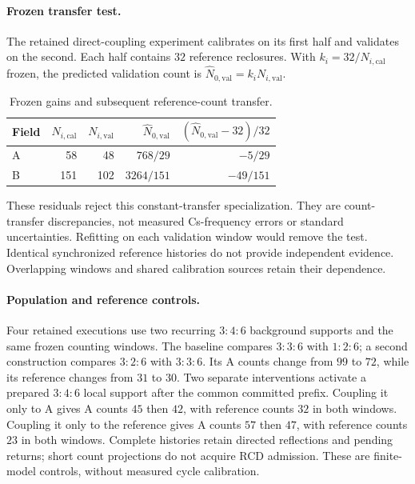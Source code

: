 \paragraph{Frozen transfer test.}
The retained direct-coupling experiment calibrates on its first half and
validates on the second. Each half contains \(32\) reference reclosures.
With \(k_i=32/N_{i,\mathrm{cal}}\) frozen, the predicted validation count is
\(\widehat N_{0,\mathrm{val}}=k_iN_{i,\mathrm{val}}\).
\begin{table}[H]
\centering
\caption{Frozen gains and subsequent reference-count transfer.}
\label{tab:manual-m3-anchor-transfer}
\begin{tabular}{lrrrr}
\toprule
Field & \(N_{i,\mathrm{cal}}\) & \(N_{i,\mathrm{val}}\) &
 \(\widehat N_{0,\mathrm{val}}\) & \((\widehat N_{0,\mathrm{val}}-32)/32\)\\
\midrule
A & 58 & 48 & \(768/29\) & \(-5/29\)\\
B & 151 & 102 & \(3264/151\) & \(-49/151\)\\
\bottomrule
\end{tabular}
\end{table}
These residuals reject this constant-transfer specialization. They are
count-transfer discrepancies, not measured Cs-frequency errors or standard
uncertainties. Refitting on each validation window would remove the test.
Identical synchronized reference histories do not provide independent
evidence. Overlapping windows and shared calibration sources retain their
dependence.

\paragraph{Population and reference controls.}
Four retained executions use two recurring \(3{:}4{:}6\) background supports
and the same frozen counting windows.
The baseline compares \(3{:}3{:}6\) with \(1{:}2{:}6\); a second construction compares
\(3{:}2{:}6\) with \(3{:}3{:}6\). Its A counts change from \(99\) to \(72\), while
its reference changes from \(31\) to \(30\). Two separate interventions
activate a prepared \(3{:}4{:}6\) local support after the common committed prefix.
Coupling it only to A gives A counts \(45\) then \(42\), with reference
counts \(32\) in both windows. Coupling it only to the reference gives A
counts \(57\) then \(47\), with reference counts \(23\) in both windows.
Complete histories retain directed reflections and pending returns; short
count projections do not acquire RCD admission. These are finite-model
controls, without measured cycle calibration.

